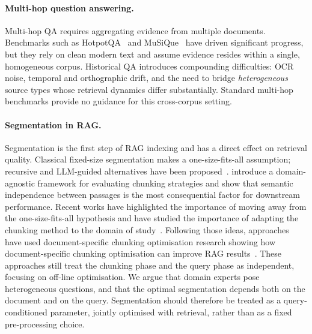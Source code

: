 \paragraph{Multi-hop question answering.}
Multi-hop QA requires aggregating evidence from multiple documents.
Benchmarks such as HotpotQA~\cite{hotpotqa_2018} and
MuSiQue~\cite{musique_2022} have driven significant progress, but they rely
on clean modern text and assume evidence resides within a single,
homogeneous corpus.
Historical QA introduces compounding difficulties: OCR noise, temporal and
orthographic drift, and the need to bridge
\emph{heterogeneous} source types whose retrieval dynamics differ
substantially.
Standard multi-hop benchmarks provide no guidance for this cross-corpus
setting.





\paragraph{Segmentation in RAG.}
Segmentation is the first step of RAG indexing and has a direct effect on
retrieval quality.
Classical fixed-size segmentation makes a one-size-fits-all assumption;
recursive and LLM-guided alternatives have been
proposed~\cite{chromadb_chunking_2024}.
\citet{hope_2025} introduce a domain-agnostic framework for evaluating
chunking strategies and show that semantic independence between passages is
the most consequential factor for downstream performance.
Recent works have highlighted the importance of moving away from the one-size-fits-all hypothesis and have studied the importance of adapting the chunking method to the domain of study~\cite{reconstructingcontextevaluatingadvanced,mocmixturestextchunking}.
Following those ideas, approaches have used document-specific chunking optimisation research showing how document-specific chunking optimisation can improve RAG results~\cite{adaptive_chunking}. These approaches still treat the chunking phase and the query phase as independent, focusing on off-line optimisation. We argue that domain experts pose heterogeneous questions, and that the optimal segmentation depends both on the document and on the query.
Segmentation should therefore be treated as a query-conditioned parameter, jointly optimised with retrieval, rather than as a fixed pre-processing choice.